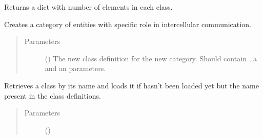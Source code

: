 \documentclass[letterpaper,10pt,english]{sphinxmanual}
\begin{document}
\begin{fulllineitems}
\begin{fulllineitems}
\end{fulllineitems}


\begin{fulllineitems}
\label{\detokenize{reference:pypath.annot.CustomAnnotation.counts}}
Returns a dict with number of elements in each class.

\end{fulllineitems}


\begin{fulllineitems}
\label{\detokenize{reference:pypath.annot.CustomAnnotation.create_class}}
Creates a category of entities with specific role in
intercellular communication.
\begin{quote}\begin{description}
\item[{Parameters}] \leavevmode
{} () \textendash{} The new class definition for the new category. Should
contain , a  and an 
parameters.

\end{description}\end{quote}

\end{fulllineitems}


\begin{fulllineitems}
\label{\detokenize{reference:pypath.annot.CustomAnnotation.get_class}}
Retrieves a class by its name and loads it if hasn’t been loaded
yet but the name present in the class definitions.
\begin{quote}\begin{description}
\item[{Parameters}] \leavevmode
{} () \textendash{} 


\end{description}
\end{quote}
\end{fulllineitems}
\end{fulllineitems}
\end{document}
